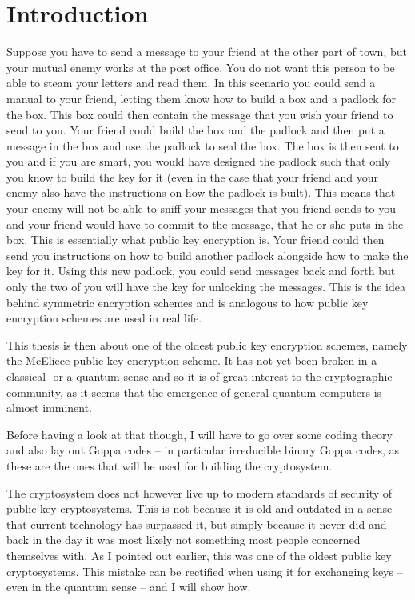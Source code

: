 
\chapter{Introduction}
\label{chap:intro}

Suppose you have to send a message to your friend at the other part of town, but your mutual enemy works at the post office. You do not want this person to be able to steam your letters and read them. In this scenario you could send a manual to your friend, letting them know how to build a box and a padlock for the box. This box could then contain the message that you wish your friend to send to you. Your friend could build the box and the padlock and then put a message in the box and use the padlock to seal the box. The box is then sent to you and if you are smart, you would have designed the padlock such that only you know to build the key for it (even in the case that your friend and your enemy also have the instructions on how the padlock is built). This means that your enemy will not be able to sniff your messages that you friend sends to you and your friend would have to commit to the message, that he or she puts in the box. This is essentially what public key encryption is. Your friend could then send you instructions on how to build another padlock alongside how to make the key for it. Using this new padlock, you could send messages back and forth but only the two of you will have the key for unlocking the messages. This is the idea behind symmetric encryption schemes and is analogous to how public key encryption schemes are used in real life.

This thesis is then about one of the oldest public key encryption schemes, namely the McEliece public key encryption scheme. It has not yet been broken in a classical- or a quantum sense and so it is of great interest to the cryptographic community, as it seems that the emergence of general quantum computers is almost imminent.

Before having a look at that though, I will have to go over some coding theory and also lay out Goppa codes -- in particular irreducible binary Goppa codes, as these are the ones that will be used for building the cryptosystem.

The cryptosystem does not however live up to modern standards of security of public key cryptosystems. This is not because it is old and outdated in a sense that current technology has surpassed it, but simply because it never did and back in the day it was most likely not something most people concerned themselves with. As I pointed out earlier, this was one of the oldest public key cryptosystems. This mistake can be rectified when using it for exchanging keys -- even in the quantum sense -- and I will show how.

